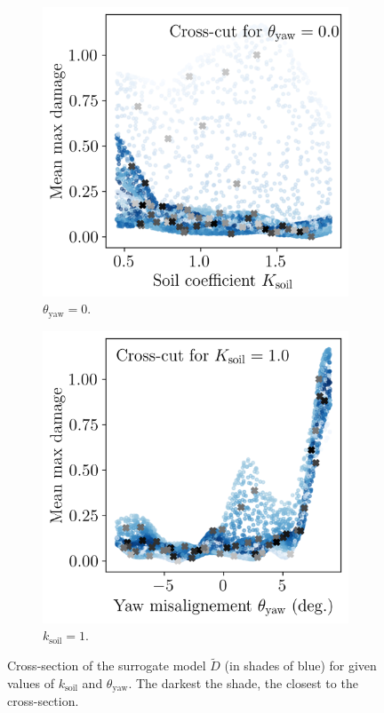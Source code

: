 \begin{figure}[h!]
    \centering
    \begin{subfigure}[b]{0.38\linewidth}
        \includegraphics[width=\linewidth]{./part3/figures/OWT/dam_vs_soil_surrogate.png}
        \caption{$\theta_{\mathrm{yaw}}=0$.}
    \end{subfigure}
    \begin{subfigure}[b]{0.38\linewidth}
        \includegraphics[width=\linewidth]{./part3/figures/OWT/dam_vs_yaw_surrogate.png}
        \caption{$k_{\mathrm{soil}}=1$.}
    \end{subfigure}
    \caption{Cross-section of the surrogate model $\widetilde{D}$ (in shades of blue) for given values of $k_{\mathrm{soil}}$ and $\theta_{\mathrm{yaw}}$. The darkest the shade, the closest to the cross-section.}
    \label{fig:owt_surrogate}
\end{figure}

